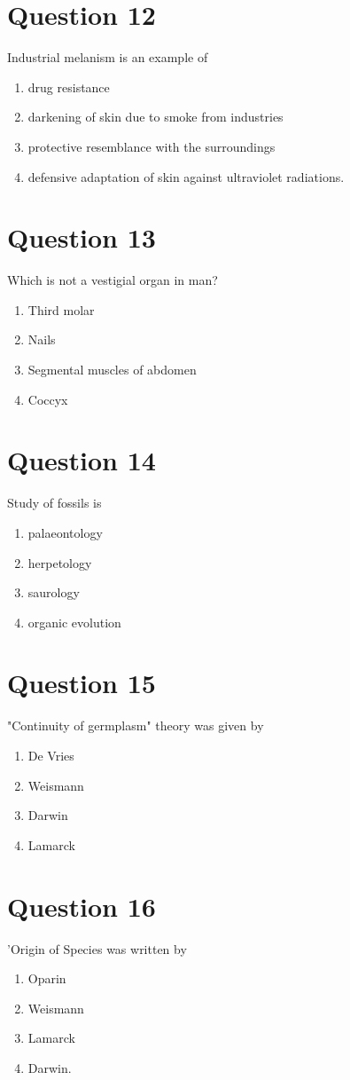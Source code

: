 \documentclass{article}
\begin{document}
\section*{Question 12}
Industrial melanism is an example of 
\begin{enumerate}[label=(\alph*)]
\item  drug resistance
\item  darkening of skin due to smoke from industries
\item  protective resemblance with the surroundings
\item  defensive adaptation of skin against ultraviolet radiations.
\end{enumerate}
\newpage
\section*{Question 13}
Which is not a vestigial organ in man? 
\begin{enumerate}[label=(\alph*)]
\item  Third molar
\item  Nails
\item  Segmental muscles of abdomen
\item  Coccyx
\end{enumerate}
\newpage
\section*{Question 14}
Study of fossils is 
\begin{enumerate}[label=(\alph*)]
\item  palaeontology
\item  herpetology
\item  saurology
\item  organic evolution
\end{enumerate}
\newpage
\section*{Question 15}
"Continuity of germplasm" theory was given by 
\begin{enumerate}[label=(\alph*)]
\item  De Vries
\item  Weismann
\item  Darwin
\item  Lamarck
\end{enumerate}
\newpage
\section*{Question 16}
'Origin of Species was written by 
\begin{enumerate}[label=(\alph*)]
\item  Oparin
\item  Weismann
\item  Lamarck
\item  Darwin.
\end{enumerate}
\newpage
\end{document}
